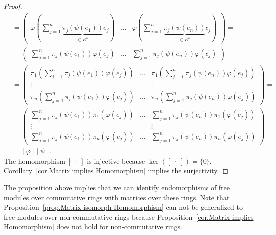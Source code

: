 \begin{proof}
\begin{align*}
&=\begin{pmatrix}\varphi(\sum_{j=1}^n\underbrace{\pi_j(\psi(e_1))}_{\in R^n}e_j) & \ldots & \varphi(\sum_{j=1}^n\underbrace{\pi_j(\psi(e_n))}_{\in R^n}e_j)\end{pmatrix}=\\
&=\begin{pmatrix}\sum_{j=1}^n\pi_j(\psi(e_1))\varphi(e_j) & \ldots & \sum_{j=1}^n\pi_j(\psi(e_n))\varphi(e_j)\end{pmatrix}=\\
&=\begin{pmatrix}
\pi_1(\sum_{j=1}^n\pi_j(\psi(e_1))\varphi(e_j)) & \ldots & \pi_1(\sum_{j=1}^n\pi_j(\psi(e_n))\varphi(e_j))\\
\vdots & &\vdots\\
\pi_n(\sum_{j=1}^n\pi_j(\psi(e_1))\varphi(e_j)) & \ldots & \pi_n(\sum_{j=1}^n\pi_j(\psi(e_n))\varphi(e_j))
\end{pmatrix}=\\
&=\begin{pmatrix}
\sum_{j=1}^n\pi_j(\psi(e_1))\pi_1(\varphi(e_j)) & \ldots & \sum_{j=1}^n\pi_j(\psi(e_n))\pi_1(\varphi(e_j))\\
\vdots & &\vdots\\
\sum_{j=1}^n\pi_j(\psi(e_1))\pi_n(\varphi(e_j)) & \ldots & \sum_{j=1}^n\pi_j(\psi(e_n))\pi_n(\varphi(e_j))
\end{pmatrix}=\\
&=[\varphi][\psi].
\end{align*}
The homomorphism $[\;\cdot\;]$ is injective because $\ker([\;\cdot\;])=\lbrace 0\rbrace$. Corollary~\ref{cor.Matrix implies Homomorphism} implies the surjectivity.
\end{proof}

The proposition above implies that we can identify endomorphisms of free modules over commutative rings with matrices over these rings. Note that Proposition~\ref{prop.Matrix isomorph Homomorphism} can not be generalized to free modules over non-commutative rings because  Proposition~\ref{cor.Matrix implies Homomorphism} does not hold for non-commutative rings.
